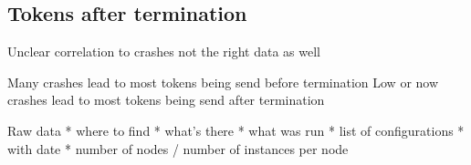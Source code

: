 \subsection{Tokens after termination}
Unclear correlation to crashes not the right data as well

Many crashes lead to most tokens being send before termination
Low or now crashes lead to most tokens being send after termination



Raw data 
* where to find
* what's there
* what was run
* list of configurations
* with date
* number of nodes / number of instances per node


